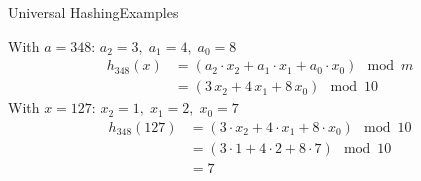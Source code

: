 
\begin{frame}{Universal Hashing}{Examples}
  \begin{example}[$\mathbb{U} = \{0, \dots, 999\}, \; m = 10, \; a = 348$]%
    With $a=348$: $a_2 = 3, \; a_1 = 4, \; a_0 = 8$
    \begin{align*}
      h_{348}(x) &= (a_2 \cdot x_2 + a_1 \cdot x_1 + a_0 \cdot x_0) \mod m\\
      {} &= (3 \, x_2 + 4 \, x_1 + 8 \, x_0) \mod 10
    \end{align*}
    With $x = 127$: $x_2 = 1, \; x_1 = 2, \; x_0 = 7$
    \begin{align*}
      h_{348}(127) &= (3 \cdot x_2 + 4 \cdot x_1 + 8 \cdot x_0) \mod 10\\
      {} &= (3 \cdot 1 + 4 \cdot 2 + 8 \cdot 7) \mod 10\\
      {} &= 7
    \end{align*}
  \end{example}
\end{frame}

